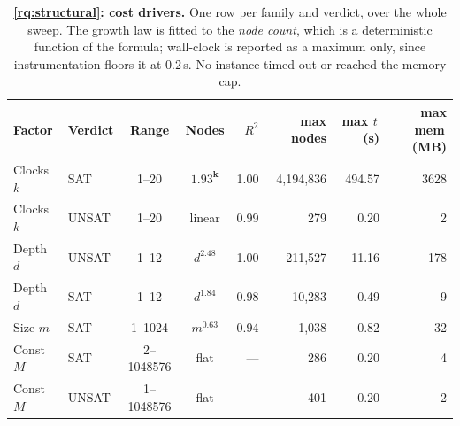 \begin{table}[t]\centering
\caption{\textbf{\ref{rq:structural}: cost drivers.} One row per family and verdict, over the whole sweep.
The growth law is fitted to the \emph{node count}, which is a deterministic function of the formula;
wall-clock is reported as a maximum only, since instrumentation floors it at $0.2$\,s. No instance
timed out or reached the memory cap.}\label{tab:rq1}
\small\setlength{\tabcolsep}{5pt}
\begin{tabular}{llccrrrr}
\toprule
Factor & Verdict & Range & Nodes & $R^2$ & max nodes & max $t$\,(s) & max mem\,(MB)\\
\midrule
Clocks $k$ & SAT & 1--20 & $\mathbf{1.93^{k}}$ & 1.00 & 4{,}194{,}836 & 494.57 & 3628 \\
Clocks $k$ & UNSAT & 1--20 & linear & 0.99 & 279 & 0.20 & 2 \\
Depth $d$ & UNSAT & 1--12 & $d^{2.48}$ & 1.00 & 211{,}527 & 11.16 & 178 \\
Depth $d$ & SAT & 1--12 & $d^{1.84}$ & 0.98 & 10{,}283 & 0.49 & 9 \\
Size $m$ & SAT & 1--1024 & $m^{0.63}$ & 0.94 & 1{,}038 & 0.82 & 32 \\
Const $M$ & SAT & 2--1048576 & flat & --- & 286 & 0.20 & 4 \\
Const $M$ & UNSAT & 1--1048576 & flat & --- & 401 & 0.20 & 2 \\
\bottomrule
\end{tabular}
\end{table}
